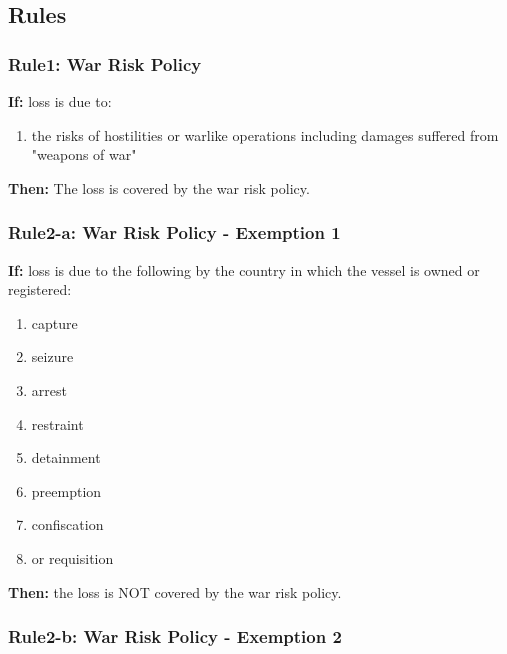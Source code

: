 \subsection{Rules}

\subsubsection{Rule1: War Risk Policy} 

    \textbf{If:} loss is due to:
    
    \begin{enumerate}
         \item the risks of hostilities or warlike operations including damages suffered from "weapons of war"
    \end{enumerate}
    
    
    \textbf{Then:} The loss is covered by the war risk policy.
        
\subsubsection{Rule2-a: War Risk Policy - Exemption 1}

    \textbf{If:} loss is due to the following by the country in which the vessel is owned or registered: 
    \begin{enumerate}
        \item capture
        \item seizure
        \item arrest
        \item restraint 
        \item detainment
        \item preemption
        \item confiscation
        \item or requisition
    \end{enumerate}
    
    \textbf{Then:} the loss is NOT covered by the war risk policy.
    
    

\subsubsection{Rule2-b: War Risk Policy - Exemption 2}

